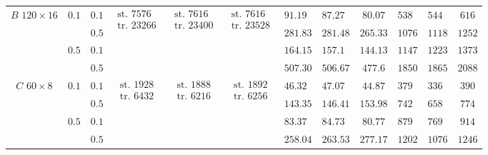 \begin{table}[tp]
{\begin{tabular}{|c|c|c|c|c|c|g|h|c|g|h|c|}
       &  & $0.1$ &  &   &   & $91.19$ & $87.27$ & $80.07$ & $538$ & $544$ & $616$ \\ \hhline{|~|~|-|~|~|~|-|-|-|-|-|-|}
       & & $0.5$ & & & & $281.83$ & $281.48$ & $265.33$ & $1076$ & $1118$ & $1252$\\ \hhline{|~|-|-|~|~|~|-|-|-|-|-|-|}
       &  & $0.1$ & & & & $164.15$ & $157.1$ & $144.13$ & $1147$ & $1223$ & $1373$ \\ \hhline{|~|~|-|~|~|~|-|-|-|-|-|-|}
       & & $0.5$ & & & & $507.30$ & $506.67$ & $477.6$ & $1850$ & $1865$ & $2088$ \\ \hline

       &  & $0.1$ &  &   &   & $46.32$ & $47.07$ & $44.87$ & $379$ & $336$ & $390$ \\ \hhline{|~|~|-|~|~|~|-|-|-|-|-|-|}
       & & $0.5$ & & & & $143.35$ & $146.41$ & $153.98$ & $742$ & $658$ & $774$ \\ \hhline{|~|-|-|~|~|~|-|-|-|-|-|-|}
       &  & $0.1$ & & & & $83.37$ & $84.73$ & $80.77$ & $879$ & $769$ & $914$ \\ \hhline{|~|~|-|~|~|~|-|-|-|-|-|-|}
       & & $0.5$ & & & & $258.04$ & $263.53$ & $277.17$ & $1202$ & $1076$ & $1246$ \\ \hline


\end{tabular}}
\end{table}
